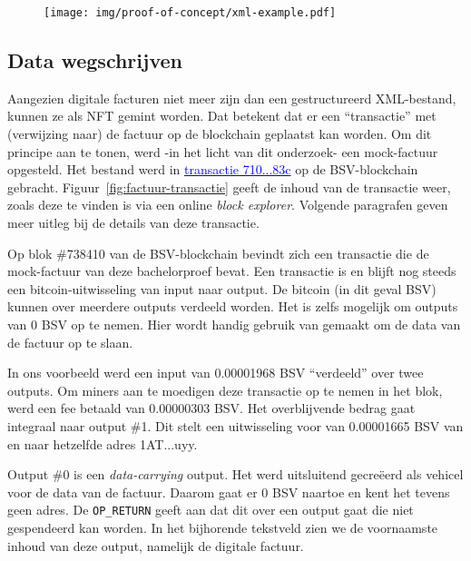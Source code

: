 \begin{figure}[H]
	\centering
	\texttt{[image: img/proof-of-concept/xml-example.pdf]}
\end{figure}


\subsection{Data wegschrijven}
\label{sub:data-wegschrijven}

Aangezien digitale facturen niet meer zijn dan een gestructureerd XML-bestand, kunnen ze als NFT gemint worden. Dat betekent dat er een ``transactie'' met (verwijzing naar) de factuur op de blockchain geplaatst kan worden. Om dit principe aan te tonen, werd -in het licht van dit onderzoek- een mock-factuur opgesteld. Het bestand werd in \href{https://whatsonchain.com/tx/71054b6b9aef47124cc5db9983a06d7608ec408c1ed3ee3a0ad0e34e2951c83c}{\textcolor{blue}{transactie 710...83c}} op de BSV-blockchain gebracht. Figuur~\ref{fig:factuur-transactie} geeft de inhoud van de transactie weer, zoals deze te vinden is via een online \textit{block explorer}. Volgende paragrafen geven meer uitleg bij de details van deze transactie.

Op blok \#738410 van de BSV-blockchain bevindt zich een transactie die de mock-factuur van deze bachelorproef bevat. Een transactie is en blijft nog steeds een bitcoin-uitwisseling van input naar output. De bitcoin (in dit geval BSV) kunnen over meerdere outputs verdeeld worden. Het is zelfs mogelijk om outputs van 0 BSV op te nemen. Hier wordt handig gebruik van gemaakt om de data van de factuur op te slaan.

In ons voorbeeld werd een input van 0.00001968 BSV ``verdeeld'' over twee outputs. Om miners aan te moedigen deze transactie op te nemen in het blok, werd een fee betaald van 0.00000303 BSV. Het overblijvende bedrag gaat integraal naar output \#1. Dit stelt een uitwisseling voor van 0.00001665 BSV van en naar hetzelfde adres 1AT...uyy.

Output \#0 is een \textit{data-carrying} output. Het werd uitsluitend gecreëerd als vehicel voor de data van de factuur. Daarom gaat er 0 BSV naartoe en kent het tevens geen adres. De \verb|OP_RETURN| geeft aan dat dit over een output gaat die niet gespendeerd kan worden. In het bijhorende tekstveld zien we de voornaamste inhoud van deze output, namelijk de digitale factuur.

